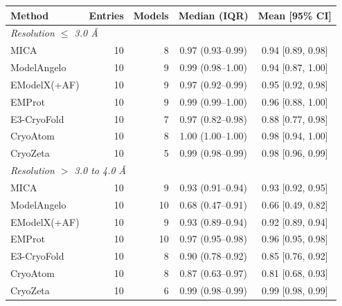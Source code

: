 \begin{tabular}{lrrcc}
\toprule
Method & Entries & Models & Median (IQR) & Mean [95\% CI] \\
\midrule
\multicolumn{5}{l}{\emph{Resolution $\leq$ 3.0 \AA}} \\
MICA & 10 & 8 & 0.97 (0.93--0.99) & 0.94 [0.89, 0.98] \\
ModelAngelo & 10 & 9 & 0.99 (0.98--1.00) & 0.94 [0.87, 1.00] \\
EModelX(+AF) & 10 & 9 & 0.97 (0.92--0.99) & 0.95 [0.92, 0.98] \\
EMProt & 10 & 9 & 0.99 (0.99--1.00) & 0.96 [0.88, 1.00] \\
E3-CryoFold & 10 & 7 & 0.97 (0.82--0.98) & 0.88 [0.77, 0.98] \\
CryoAtom & 10 & 8 & 1.00 (1.00--1.00) & 0.98 [0.94, 1.00] \\
CryoZeta & 10 & 5 & 0.99 (0.98--0.99) & 0.98 [0.96, 0.99] \\
\midrule
\multicolumn{5}{l}{\emph{Resolution $>$ 3.0 to 4.0 \AA}} \\
MICA & 10 & 9 & 0.93 (0.91--0.94) & 0.93 [0.92, 0.95] \\
ModelAngelo & 10 & 10 & 0.68 (0.47--0.91) & 0.66 [0.49, 0.82] \\
EModelX(+AF) & 10 & 9 & 0.93 (0.89--0.94) & 0.92 [0.89, 0.94] \\
EMProt & 10 & 10 & 0.97 (0.95--0.98) & 0.96 [0.95, 0.98] \\
E3-CryoFold & 10 & 8 & 0.90 (0.78--0.92) & 0.85 [0.76, 0.92] \\
CryoAtom & 10 & 8 & 0.87 (0.63--0.97) & 0.81 [0.68, 0.93] \\
CryoZeta & 10 & 6 & 0.99 (0.98--0.99) & 0.99 [0.98, 0.99] \\
\bottomrule
\end{tabular}
